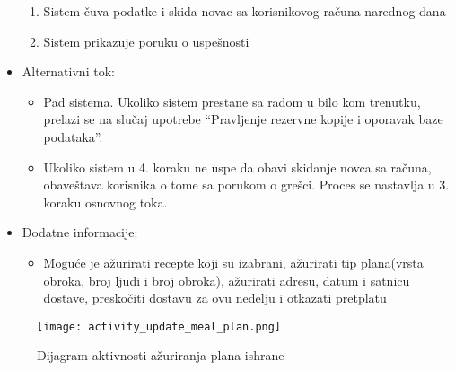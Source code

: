 \begin{itemize}
\begin{enumerate}
            \item Sistem čuva podatke i skida novac sa korisnikovog računa narednog dana
            \item Sistem prikazuje poruku o uspešnosti 
        \end{enumerate}
    \item Alternativni tok:
        \begin{itemize}
            \item Pad sistema. Ukoliko sistem prestane sa radom u bilo kom trenutku, prelazi se na slučaj upotrebe ``Pravljenje rezervne kopije i oporavak baze podataka''.
            \item Ukoliko sistem u 4. koraku ne uspe da obavi skidanje novca sa računa, obaveštava korisnika o tome sa porukom o grešci. Proces se nastavlja u 3. koraku osnovnog toka.
        \end{itemize}
    \item Dodatne informacije:
        \begin{itemize}
            \item Moguće je ažurirati recepte koji su izabrani, ažurirati tip plana(vrsta obroka, broj ljudi i broj obroka), ažurirati adresu, datum i satnicu dostave, preskočiti dostavu za ovu nedelju i otkazati pretplatu 
        \end{itemize}
\end{itemize}

\begin{figure}[H]
\begin{center}
\texttt{[image: activity\_update\_meal\_plan.png]}
\end{center}
    \caption{Dijagram aktivnosti ažuriranja plana ishrane}
\label{fig:ActivityUpdateMealPlan}
\end{figure}

